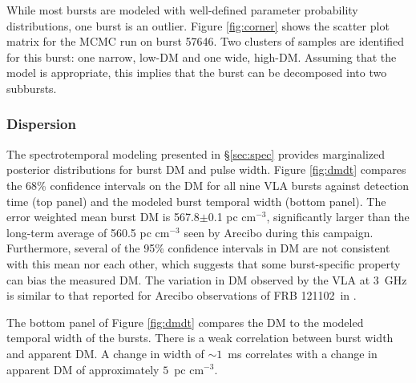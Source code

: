 \documentclass[twocolumn]{aastex61}
\newcommand{\frb}{FRB 121102}
\begin{document}
While most bursts are modeled with well-defined parameter probability distributions, one burst is an outlier. Figure \ref{fig:corner} shows the scatter plot matrix \citep{corner} for the MCMC run on burst 57646. Two clusters of samples are identified for this burst: one narrow, low-DM and one wide, high-DM. Assuming that the model is appropriate, this implies that the burst can be decomposed into two subbursts.

\subsubsection{Dispersion}

The spectrotemporal modeling presented in \S \ref{sec:spec} provides marginalized posterior distributions for burst DM and pulse width. Figure \ref{fig:dmdt} compares the 68\% confidence intervals on the DM for all nine VLA bursts against detection time (top panel) and the modeled burst temporal width (bottom panel). The error weighted mean burst DM is 567.8$\pm$0.1 pc cm$^{-3}$, significantly larger than the long-term average of 560.5 pc cm$^{-3}$ seen by Arecibo during this campaign. Furthermore, several of the 95\% confidence intervals in DM are not consistent with this mean nor each other, which suggests that some burst-specific property can bias the measured DM. The variation in DM observed by the VLA at 3~GHz is similar to that reported for Arecibo observations of \frb\ in \citet{2016arXiv160308880S}.

The bottom panel of Figure \ref{fig:dmdt} compares the DM to the modeled temporal width of the bursts. There is a weak correlation between burst width and apparent DM. A change in width of $\sim1$~ms correlates with a change in apparent DM of approximately $5$~pc cm$^{-3}$.
\end{document}

